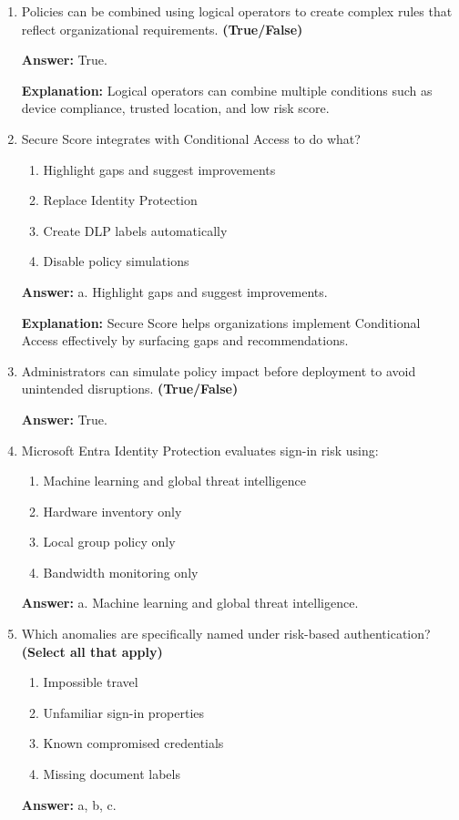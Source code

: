 \documentclass[10pt]{article}
\begin{document}
\begin{enumerate}[leftmargin=*]
\item Policies can be combined using logical operators to create complex rules that reflect organizational requirements. \textbf{(True/False)}

\textbf{Answer:} True.

\textbf{Explanation:} Logical operators can combine multiple conditions such as device compliance, trusted location, and low risk score.

\item Secure Score integrates with Conditional Access to do what?
\begin{enumerate}[label=\alph*., leftmargin=1.5em]
\item Highlight gaps and suggest improvements
\item Replace Identity Protection
\item Create DLP labels automatically
\item Disable policy simulations
\end{enumerate}
\textbf{Answer:} a. Highlight gaps and suggest improvements.

\textbf{Explanation:} Secure Score helps organizations implement Conditional Access effectively by surfacing gaps and recommendations.

\item Administrators can simulate policy impact before deployment to avoid unintended disruptions. \textbf{(True/False)}

\textbf{Answer:} True.

\item Microsoft Entra Identity Protection evaluates sign-in risk using:
\begin{enumerate}[label=\alph*., leftmargin=1.5em]
\item Machine learning and global threat intelligence
\item Hardware inventory only
\item Local group policy only
\item Bandwidth monitoring only
\end{enumerate}
\textbf{Answer:} a. Machine learning and global threat intelligence.

\item Which anomalies are specifically named under risk-based authentication? \textbf{(Select all that apply)}
\begin{enumerate}[label=\alph*., leftmargin=1.5em]
\item Impossible travel
\item Unfamiliar sign-in properties
\item Known compromised credentials
\item Missing document labels
\end{enumerate}
\textbf{Answer:} a, b, c.


\end{enumerate}
\end{document}
